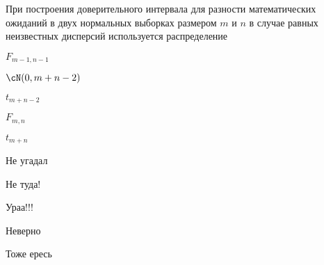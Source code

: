 
\begin{question}
При построения доверительного интервала для разности математических
ожиданий в двух нормальных выборках размером \(m\) и \(n\) в случае
равных неизвестных дисперсий используется распределение
\begin{answerlist}
  \item \(F_{m-1, n-1}\)
  \item \(\cN(0, m+n-2)\)
  \item \(t_{m+n-2}\)
  \item \(F_{m,n}\)
  \item \(t_{m+n}\)
\end{answerlist}
\end{question}

\begin{solution}
\begin{answerlist}
  \item Не угадал
  \item Не туда!
  \item Ураа!!!
  \item Неверно
  \item Тоже ересь
\end{answerlist}
\end{solution}

